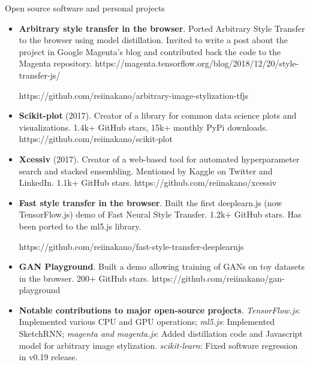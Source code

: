 \documentclass[]{mcdowellcv}
\begin{document}
	\begin{cvsection}{Open source software and personal projects}
		\begin{cvsubsection}{}{}{}
			\begin{itemize}
			
			    \item \textbf{Arbitrary style transfer in the browser}. Ported Arbitrary Style Transfer to the browser using model distillation. Invited to write a post about the project in Google Magenta's blog and contributed back the code to the Magenta repository. https://magenta.tensorflow.org/blog/2018/12/20/style-transfer-js/
			    
			    https://github.com/reiinakano/arbitrary-image-stylization-tfjs 
			    \item \textbf{Scikit-plot} (2017). Creator of a library for common data science plots and visualizations. 1.4k+ GitHub stars, 15k+ monthly PyPi downloads. https://github.com/reiinakano/scikit-plot
				\item \textbf{Xcessiv} (2017). Creator of a web-based tool for automated hyperparameter search and stacked ensembling. Mentioned by Kaggle on Twitter and LinkedIn. 1.1k+ GitHub stars. https://github.com/reiinakano/xcessiv
				\item \textbf{Fast style transfer in the browser}. Built the first deeplearn.js (now TensorFlow.js) demo of Fast Neural Style Transfer. 1.2k+ GitHub stars. Has been ported to the ml5.js library. 
				
				https://github.com/reiinakano/fast-style-transfer-deeplearnjs
				\item \textbf{GAN Playground}. Built a demo allowing training of GANs on toy datasets in the browser. 200+ GitHub stars. https://github.com/reiinakano/gan-playground
				\item \textbf{Notable contributions to major open-source projects}. \textit{TensorFlow.js}: Implemented various CPU and GPU operations; \textit{ml5.js}: Implemented SketchRNN; \textit{magenta and magenta.js}: Added distillation code and Javascript model for arbitrary image stylization. \textit{scikit-learn}: Fixed software regression in v0.19 release.
			\end{itemize}
		\end{cvsubsection}
	\end{cvsection}
	
\end{document}
